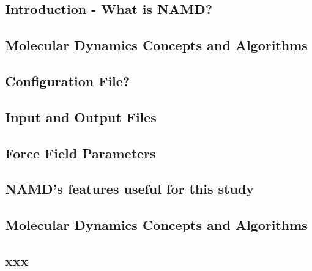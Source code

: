 \subsection{Introduction - What is NAMD?}

\subsection{Molecular Dynamics Concepts and Algorithms}

\subsection{Configuration File?}

\subsection{Input and Output Files}

\subsection{Force Field Parameters}

\subsection{NAMD's features useful for this study}







\subsection{Molecular Dynamics Concepts and Algorithms}

\subsection{xxx}


